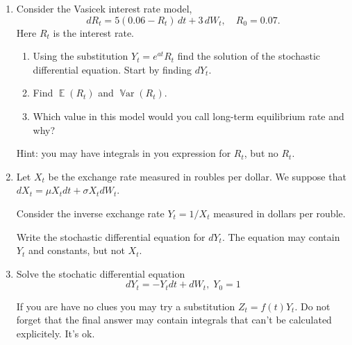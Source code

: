 \documentclass[12pt]{article}
\DeclareMathOperator{\Var}{\mathbb{V}ar}
\DeclareMathOperator{\E}{\mathbb{E}}
\begin{document}
\begin{enumerate}
  
  
  \item Consider the Vasicek interest rate model, 
  \[
    dR_t=5(0.06 - R_t) \, dt + 3 \, dW_t, \quad R_0 = 0.07.
  \]
  Here $R_t$ is the interest rate.
  \begin{enumerate}
  \item Using the substitution $Y_t=e^{at} R_t$ find the solution of the stochastic differential equation.
  Start by finding $dY_t$. 
  \item Find $\E(R_t)$ and $\Var(R_t)$.
  \item Which value in this model would you call long-term equilibrium rate and why?
  \end{enumerate}
  
  Hint: you may have integrals in you expression for $R_t$, but no $R_t$.
  
  \item Let $X_t$ be the exchange rate measured in roubles per dollar. 
  We suppose that $dX_t = \mu X_t dt + \sigma X_t dW_t$. 
  
  Consider the inverse exchange rate $Y_t = 1/X_t$ measured in dollars per rouble. 
  
  Write the stochastic differential equation for $dY_t$. 
  The equation may contain $Y_t$ and constants, but not $X_t$.
  
  \item Solve the stochatic differential equation
\[
dY_t = - Y_t dt + dW_t, \; Y_0 = 1
\]

If you are have no clues you may try a substitution $Z_t = f(t) Y_t$. 
Do not forget that the final answer may contain integrals that can't be calculated explicitely. It's ok.




  \end{enumerate}
  
\end{document}
